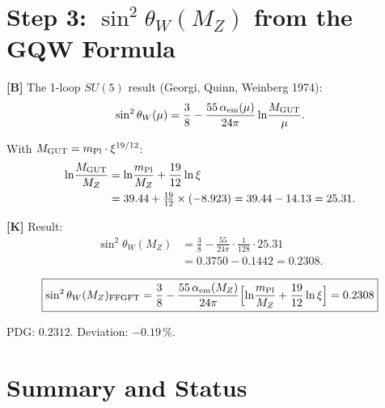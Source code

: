 \section{Step 3: $\sin^2\theta_W(M_Z)$ from the GQW Formula}

\textbf{[B]} The 1-loop $SU(5)$ result (Georgi, Quinn, Weinberg 1974):
\begin{equation}
  \sin^2\theta_W(\mu)
  = \frac{3}{8}
  - \frac{55\,\alpha_{\rm em}(\mu)}{24\pi}
    \ln\!\frac{M_{\rm GUT}}{\mu}.
\end{equation}

With $M_{\rm GUT} = m_{\rm Pl}\cdot\xi^{19/12}$:
\begin{align}
  \ln\!\frac{M_{\rm GUT}}{M_Z}
  &= \ln\!\frac{m_{\rm Pl}}{M_Z} + \frac{19}{12}\ln\xi \nonumber\\
  &= 39.44 + \tfrac{19}{12}\times(-8.923)
   = 39.44 - 14.13 = 25.31.
\end{align}

\textbf{[K]} Result:
\begin{align}
  \sin^2\theta_W(M_Z)
  &= \frac{3}{8}
   - \frac{55}{24\pi}\cdot\frac{1}{128}\cdot25.31 \nonumber\\
  &= 0.3750 - 0.1442
   = \mathbf{0.2308}.
\end{align}

\begin{equation}
  \boxed{\sin^2\theta_W(M_Z)_{\rm FFGFT}
  = \frac{3}{8}
  - \frac{55\,\alpha_{\rm em}(M_Z)}{24\pi}
    \Bigl[\ln\!\frac{m_{\rm Pl}}{M_Z}
         + \frac{19}{12}\ln\xi\Bigr]
  = 0.2308}
\end{equation}

PDG: $0.2312$. Deviation: $-0.19\,\%$.

\section{Summary and Status}

